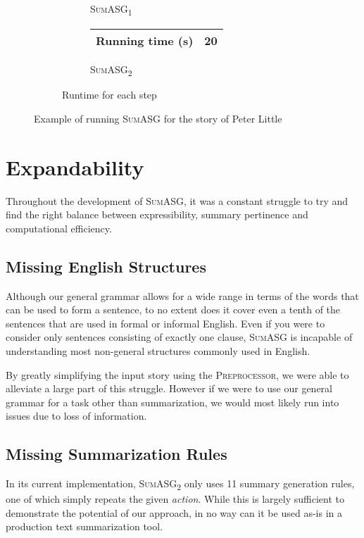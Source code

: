 \begin{figure}[H]
\begin{subfigure}{\textwidth}
\begin{subfigure}{0.5\textwidth}
\begin{tabular}{@{}lllllll@{}}
\end{tabular}
\caption{\textsc{SumASG\textsubscript{1}}}
\end{subfigure}
\begin{subfigure}{0.5\textwidth}
\renewcommand\thesubfigure{\roman{subfigure}}
\centering
\begin{tabular}{@{}ll@{}}
\toprule
Running time (s) & 20 \\ \bottomrule
\end{tabular}
\caption{\textsc{SumASG\textsubscript{2}}}
\end{subfigure}
\setcounter{subfigure}{2}
\caption{Runtime for each step}
\end{subfigure}
\caption{Example of running \textsc{SumASG} for the story of Peter Little}
\label{fig:asg_example}
\end{figure}

\section{Expandability}

Throughout the development of \textsc{SumASG}, it was a constant struggle to try and find the right balance between expressibility, summary pertinence and computational efficiency.

\subsection{Missing English Structures}

Although our general grammar allows for a wide range in terms of the words that can be used to form a sentence, to no extent does it cover even a tenth of the sentences that are used in formal or informal English. Even if you were to consider only sentences consisting of exactly one clause, \textsc{SumASG} is incapable of understanding most non-general structures commonly used in English.

By greatly simplifying the input story using the \textsc{Preprocessor}, we were able to alleviate a large part of this struggle. However if we were to use our general grammar for a task other than summarization, we would most likely run into issues due to loss of information.

\subsection{Missing Summarization Rules}

In its current implementation, \textsc{SumASG\textsubscript{2}} only uses 11 summary generation rules, one of which simply repeats the given \textit{action}. While this is largely sufficient to demonstrate the potential of our approach, in no way can it be used as-is in a production text summarization tool.

